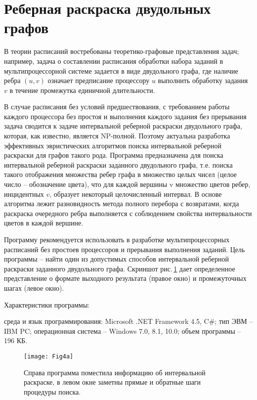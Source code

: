 \section{Реберная раскраска двудольных графов}
В теории расписаний востребованы теоретико-графовые представления задач; например, задача о составлении расписания обработки набора заданий в мультипроцессорной системе задается в виде двудольного графа, где наличие ребра $(u,v)$ означает предписание процессору $u$ выполнить обработку задания $v$ в течение промежутка единичной длительности.

В случае расписания без условий предшествования, с требованием работы каждого процессора без простоя и выполнения каждого задания без прерывания задача сводится к задаче интервальной реберной раскраски двудольного графа, которая, как известно, является NP-полной. Поэтому актуальна разработка эффективных эвристических алгоритмов поиска интервальной реберной раскраски для графов такого рода.
Программа предназначена для поиска интервальной реберной раскраски заданного двудольного графа, т.е. поиска такого отображения множества ребер графа в множество целых чисел (целое число – обозначение цвета), что для каждой вершины v множество цветов ребер, инцидентных $v$, образует некоторый целочисленный интервал. В основе алгоритма лежит разновидность метода полного перебора с возвратами, когда раскраска очередного ребра выполняется с соблюдением свойства интервальности цветов в каждой вершине.

Программу \cite{akm-prog4} рекомендуется использовать в разработке мультипроцессорных расписаний без простоев процессоров и прерывания выполнения заданий.
Цель программы – найти один из допустимых способов интервальной реберной раскраски заданного двудольного графа. Скриншот рис.\,\ref{MAM_Fig4a} дает определенное представление о формате выходного результата (правое окно) и промежуточных шагах (левое окно).

Характеристики программы:

среда и язык программирования: Microsoft .NET Framework 4.5, C\#;
тип ЭВМ – IBM PC;
операционная система – Windows 7.0, 8.1, 10.0;
объем программы – 196 КБ.
\begin{figure}[h]
  \texttt{[image: Fig4a]}
  \caption{Справа программа поместила информацию об интервальной раскраске, в левом окне заметны прямые и обратные шаги процедуры поиска.}\label{MAM_Fig4a}
\end{figure}
\par\medskip
